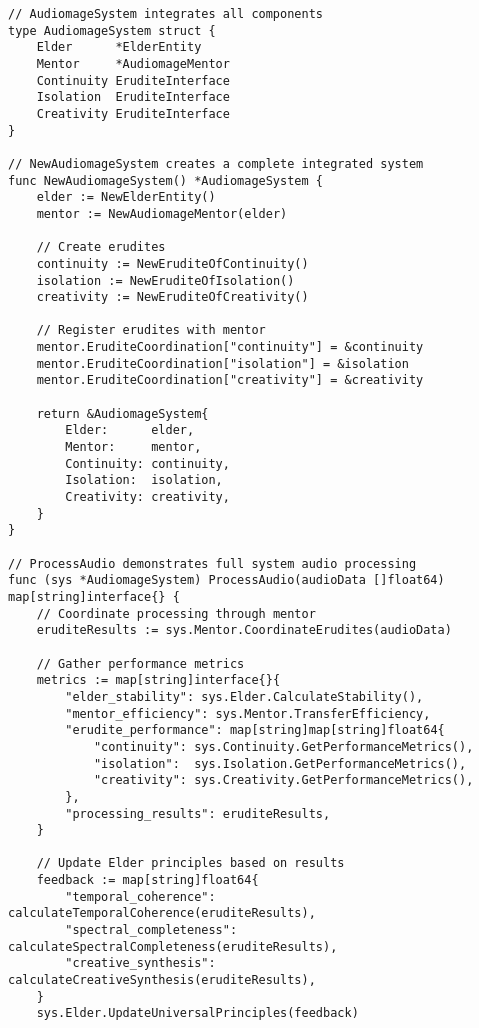 \begin{tcolorbox}[colback=CodeBackground, colframe=DarkGray, title=Complete System Integration, fonttitle=\bfseries]
\begin{verbatim}
// AudiomageSystem integrates all components
type AudiomageSystem struct {
    Elder      *ElderEntity
    Mentor     *AudiomageMentor
    Continuity EruditeInterface
    Isolation  EruditeInterface
    Creativity EruditeInterface
}

// NewAudiomageSystem creates a complete integrated system
func NewAudiomageSystem() *AudiomageSystem {
    elder := NewElderEntity()
    mentor := NewAudiomageMentor(elder)
    
    // Create erudites
    continuity := NewEruditeOfContinuity()
    isolation := NewEruditeOfIsolation()
    creativity := NewEruditeOfCreativity()
    
    // Register erudites with mentor
    mentor.EruditeCoordination["continuity"] = &continuity
    mentor.EruditeCoordination["isolation"] = &isolation
    mentor.EruditeCoordination["creativity"] = &creativity
    
    return &AudiomageSystem{
        Elder:      elder,
        Mentor:     mentor,
        Continuity: continuity,
        Isolation:  isolation,
        Creativity: creativity,
    }
}

// ProcessAudio demonstrates full system audio processing
func (sys *AudiomageSystem) ProcessAudio(audioData []float64) map[string]interface{} {
    // Coordinate processing through mentor
    eruditeResults := sys.Mentor.CoordinateErudites(audioData)
    
    // Gather performance metrics
    metrics := map[string]interface{}{
        "elder_stability": sys.Elder.CalculateStability(),
        "mentor_efficiency": sys.Mentor.TransferEfficiency,
        "erudite_performance": map[string]map[string]float64{
            "continuity": sys.Continuity.GetPerformanceMetrics(),
            "isolation":  sys.Isolation.GetPerformanceMetrics(),
            "creativity": sys.Creativity.GetPerformanceMetrics(),
        },
        "processing_results": eruditeResults,
    }
    
    // Update Elder principles based on results
    feedback := map[string]float64{
        "temporal_coherence":   calculateTemporalCoherence(eruditeResults),
        "spectral_completeness": calculateSpectralCompleteness(eruditeResults),
        "creative_synthesis":   calculateCreativeSynthesis(eruditeResults),
    }
    sys.Elder.UpdateUniversalPrinciples(feedback)
    

\end{verbatim}
\end{tcolorbox}
